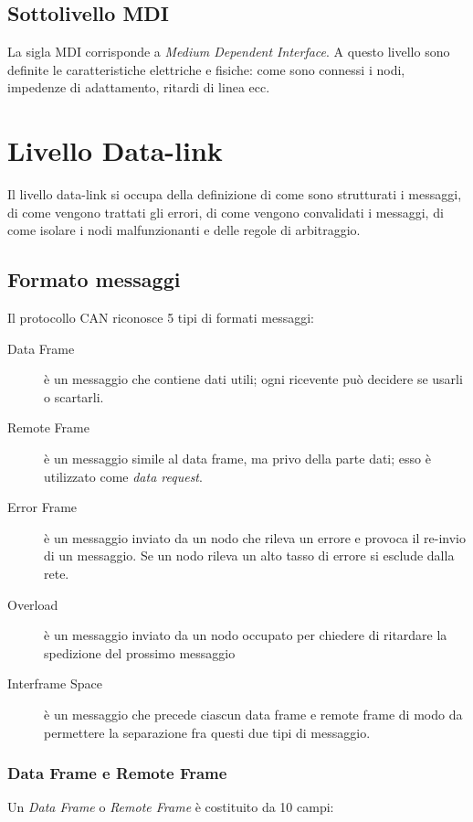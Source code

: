\documentclass[a4paper,10pt]{book}
\begin{document}

\subsection{Sottolivello MDI}
La sigla MDI corrisponde a \textit{Medium Dependent Interface}. A
questo livello sono definite le caratteristiche elettriche e fisiche:
come sono connessi i nodi, impedenze di adattamento, ritardi di linea
ecc.

\section{Livello Data-link}
Il livello data-link si occupa della definizione di come sono
strutturati i messaggi, di come vengono trattati gli errori, di come
vengono convalidati i messaggi, di come isolare i nodi malfunzionanti
e delle regole di arbitraggio.
\subsection{Formato messaggi}
Il protocollo CAN riconosce 5 tipi di formati messaggi:
\begin{description}
 \item[Data Frame] è un messaggio che contiene dati utili; ogni
ricevente può decidere se usarli o scartarli.
 \item[Remote Frame] è un messaggio simile al data frame, ma privo
della parte dati; esso è utilizzato come \textit{data request}.
 \item[Error Frame] è un messaggio inviato da un nodo che rileva un
errore e provoca il re-invio di un messaggio. Se un nodo rileva un
alto tasso di errore si esclude dalla rete.
 \item[Overload] è un messaggio inviato da un nodo occupato per
chiedere di ritardare la spedizione del prossimo messaggio
 \item[Interframe Space] è un messaggio che precede ciascun data
frame e remote frame di modo da permettere la separazione fra questi
due tipi di messaggio.
\end{description}

\subsubsection{Data Frame e Remote Frame}
Un \textit{Data Frame} o \textit{Remote Frame} è costituito da 10
campi:
\end{document}
